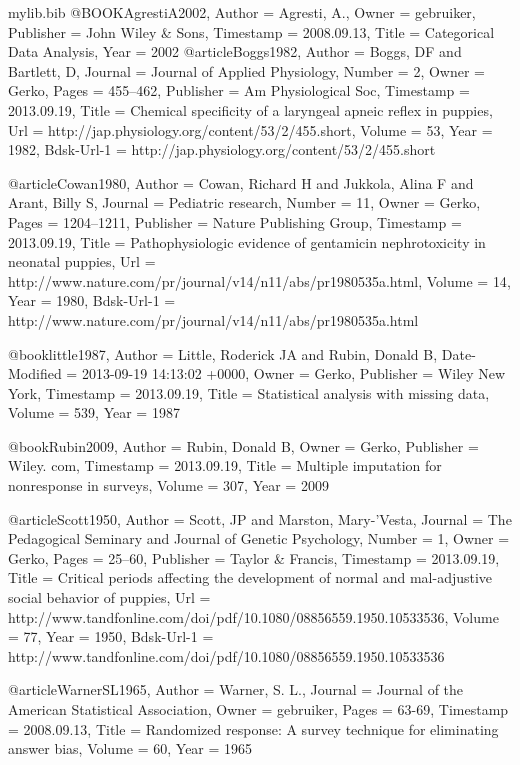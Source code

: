 \begin{filecontents*}{mylib.bib}
@BOOK{AgrestiA2002,
	Author = {Agresti, A.},
	Owner = {gebruiker},
	Publisher = {John Wiley \& Sons},
	Timestamp = {2008.09.13},
	Title = {Categorical Data Analysis},
	Year = {2002}
}
@article{Boggs1982,
	Author = {Boggs, DF and Bartlett, D},
	Journal = {Journal of Applied Physiology},
	Number = {2},
	Owner = {Gerko},
	Pages = {455--462},
	Publisher = {Am Physiological Soc},
	Timestamp = {2013.09.19},
	Title = {Chemical specificity of a laryngeal apneic reflex in puppies},
	Url = {http://jap.physiology.org/content/53/2/455.short},
	Volume = {53},
	Year = {1982},
	Bdsk-Url-1 = {http://jap.physiology.org/content/53/2/455.short}}

@article{Cowan1980,
	Author = {Cowan, Richard H and Jukkola, Alina F and Arant, Billy S},
	Journal = {Pediatric research},
	Number = {11},
	Owner = {Gerko},
	Pages = {1204--1211},
	Publisher = {Nature Publishing Group},
	Timestamp = {2013.09.19},
	Title = {Pathophysiologic evidence of gentamicin nephrotoxicity in neonatal puppies},
	Url = {http://www.nature.com/pr/journal/v14/n11/abs/pr1980535a.html},
	Volume = {14},
	Year = {1980},
	Bdsk-Url-1 = {http://www.nature.com/pr/journal/v14/n11/abs/pr1980535a.html}}

@book{little1987,
	Author = {Little, Roderick JA and Rubin, Donald B},
	Date-Modified = {2013-09-19 14:13:02 +0000},
	Owner = {Gerko},
	Publisher = {Wiley New York},
	Timestamp = {2013.09.19},
	Title = {Statistical analysis with missing data},
	Volume = {539},
	Year = {1987}}

@book{Rubin2009,
	Author = {Rubin, Donald B},
	Owner = {Gerko},
	Publisher = {Wiley. com},
	Timestamp = {2013.09.19},
	Title = {Multiple imputation for nonresponse in surveys},
	Volume = {307},
	Year = {2009}}

@article{Scott1950,
	Author = {Scott, JP and Marston, Mary-'Vesta},
	Journal = {The Pedagogical Seminary and Journal of Genetic Psychology},
	Number = {1},
	Owner = {Gerko},
	Pages = {25--60},
	Publisher = {Taylor \& Francis},
	Timestamp = {2013.09.19},
	Title = {Critical periods affecting the development of normal and mal-adjustive social behavior of puppies},
	Url = {http://www.tandfonline.com/doi/pdf/10.1080/08856559.1950.10533536},
	Volume = {77},
	Year = {1950},
	Bdsk-Url-1 = {http://www.tandfonline.com/doi/pdf/10.1080/08856559.1950.10533536}
}

@article{WarnerSL1965,
	Author = {Warner, S. L.},
	Journal = {Journal of the American Statistical Association},
	Owner = {gebruiker},
	Pages = {63-69},
	Timestamp = {2008.09.13},
	Title = {Randomized response: A survey technique for eliminating answer bias},
	Volume = {60},
	Year = {1965}
}

\end{filecontents*}

